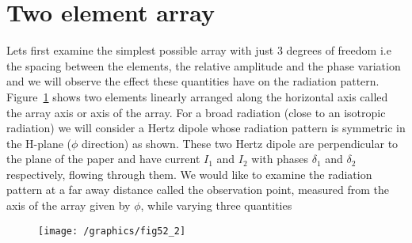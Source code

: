 \section{Two element array}
Lets first examine the simplest possible array with just 3 degrees of freedom i.e the spacing between the elements, the relative amplitude and the phase variation and we will observe the effect these quantities have on the radiation pattern. Figure~\ref{52.2} shows two elements linearly arranged along the horizontal axis called the array axis or axis of the array. For a broad radiation (close to an isotropic radiation) we will consider a Hertz dipole whose radiation pattern is symmetric in the H-plane ($\phi$ direction) as shown. These two Hertz dipole are perpendicular to the plane of the paper and have current $I_1$ and $I_2$ with phases $\delta_1$ and $\delta_2$ respectively, flowing through them. We would like to examine the radiation pattern at a far away distance called the observation point, measured from the axis of the array given by $\phi$, while varying three quantities
\begin{figure}[h]
\centering
\texttt{[image: /graphics/fig52\_2]}
\caption{}
\label{52.2}
\end{figure}

